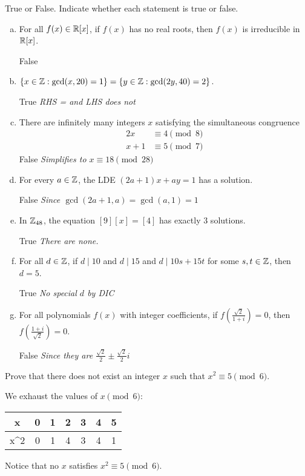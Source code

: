 \begin{prob}
  True or False. Indicate whether each statement is true or false.
  \begin{enumerate}[(a)]
    \item For all $f(x) \in \mathbb{R}[x]$, if $f(x)$ has no real roots, then $f(x)$ is irreducible in $\mathbb{R}[x]$.

           \quad False
    \item $\{x \in \mathbb{Z} : \gcd(x,20) = 1\} = \{y \in \mathbb{Z} : \gcd(2y,40) = 2\}$.

          True \quad {} \qquad \emph{RHS = \Z{} and LHS does not}
    \item There are infinitely many integers $x$ satisfying the simultaneous congruence
          \begin{align*}
            2x & \equiv 4 \pmod 8 \\ x+1 & \equiv 5 \pmod 7
          \end{align*}
           \quad False \qquad \emph{Simplifies to $x \equiv 18 \pmod{28}$}
    \item For every $a\in\mathbb{Z}$, the LDE $(2a+1)x + ay = 1$ has a solution.

           \quad False \qquad \emph{Since $\gcd(2a+1,a) = \gcd(a,1) = 1$}
    \item In $\mathbb{Z}_{48}$, the equation $[9][x] = [4]$ has exactly 3 solutions.

          True \quad {} \qquad \emph{There are none.}
    \item For all $d \in \mathbb{Z}$, if $d \mid 10$ and $d \mid 15$
          and $d \mid 10s + 15t$ for some $s,t\in\mathbb{Z}$, then $d = 5$.

          True \quad {} \qquad \emph{No special $d$ by DIC}
    \item For all polynomials $f(x)$ with integer coefficients, if $f(\frac{\sqrt{2}}{1+i}) = 0$,
          then $f(\frac{1+i}{\sqrt{2}}) = 0$.

           \quad False \qquad \emph{Since they are $\frac{\sqrt{2}}{2} \pm \frac{\sqrt{2}}{2}i$}
  \end{enumerate}
\end{prob}

\begin{prob}
  Prove that there does not exist an integer $x$ such that $x^2 \equiv 5 \pmod 6$.
\end{prob}
\begin{prf}
  We exhaust the values of $x \pmod 6$:
  \begin{center}
    \begin{tabular}{C|C|C|C|C|C|C}
      x    & 0 & 1 & 2 & 3 & 4 & 5 \\ \hline
      x^2  & 0 & 1 & 4 & 3 & 4 & 1
    \end{tabular}
  \end{center}
  Notice that no $x$ satisfies $x^2 \equiv 5 \pmod 6$.
\end{prf}

